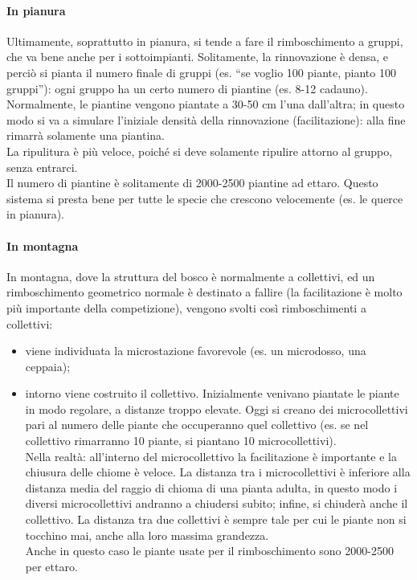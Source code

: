 \paragraph{In pianura}
Ultimamente, soprattutto in pianura, si tende a fare il rimboschimento a gruppi, che va bene anche per i sottoimpianti. Solitamente, la rinnovazione è densa, e perciò si pianta il numero finale di gruppi (es. ``se voglio 100 piante, pianto 100 gruppi''): ogni gruppo ha un certo numero di piantine (es. 8-12 cadauno).\\
Normalmente, le piantine vengono piantate a 30-50 cm l'una dall'altra; in questo modo si va a simulare l'iniziale densità della rinnovazione (facilitazione): alla fine rimarrà solamente una piantina.\\
La ripulitura è più veloce, poiché si deve solamente ripulire attorno al gruppo, senza entrarci.\\
Il numero di piantine è solitamente di 2000-2500 piantine ad ettaro. Questo sistema si presta bene per tutte le specie che crescono velocemente (es. le querce in pianura).
\paragraph{In montagna}
In montagna, dove la struttura del bosco è normalmente a collettivi, ed un rimboschimento geometrico normale è destinato a fallire (la facilitazione è molto più importante della competizione), vengono svolti così rimboschimenti a collettivi:
\begin{itemize}[nosep]
    \item viene individuata la microstazione favorevole (es. un microdosso, una ceppaia);
    \item intorno viene costruito il collettivo. Inizialmente venivano piantate le piante in modo regolare, a distanze troppo elevate. Oggi si creano dei microcollettivi pari al numero delle piante che occuperanno quel collettivo (es. se nel collettivo rimarranno 10 piante, si piantano 10 microcollettivi).\\
    Nella realtà: all'interno del microcollettivo la facilitazione è importante e la chiusura delle chiome è veloce. La distanza tra i microcollettivi è inferiore alla distanza media del raggio di chioma di una pianta adulta, in questo modo i diversi microcollettivi andranno a chiudersi subito; infine, si chiuderà anche il collettivo. La distanza tra due collettivi è sempre tale per cui le piante non si tocchino mai, anche alla loro massima grandezza.\\
    Anche in questo caso le piante usate per il rimboschimento sono 2000-2500 per ettaro. 
\end{itemize} 
